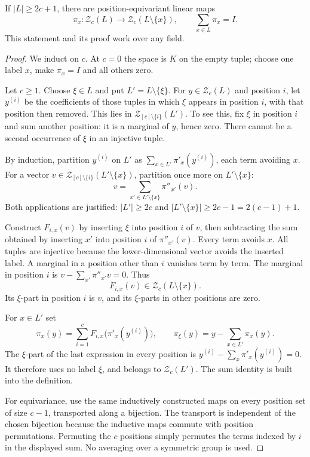 \begin{lemma}\label{tx:lem:unity}
If $|L|\ge2c+1$, there are position-equivariant linear maps
\[\pi_x:\mathcal Z_c(L)\longrightarrow \mathcal Z_c(L\setminus\{x\}),\qquad
\sum_{x\in L}\pi_x=I.
\]
This statement and its proof work over any field.
\end{lemma}
\begin{proof}
We induct on $c$. At $c=0$ the space is $K$ on the empty tuple; choose one label $x$, make $\pi_x=I$ and all others zero.

Let $c\ge1$. Choose $\xi\in L$ and put $L'=L\setminus\{\xi\}$. For $y\in \mathcal Z_c(L)$ and position $i$, let $y^{(i)}$ be the coefficients of those tuples in which $\xi$ appears in position $i$, with that position then removed. This lies in $\mathcal Z_{[c]\setminus\{i\}}(L')$. To see this, fix $\xi$ in position $i$ and sum another position: it is a marginal of $y$, hence zero. There cannot be a second occurrence of $\xi$ in an injective tuple.

By induction, partition $y^{(i)}$ on $L'$ as $\sum_{x\in L'}\pi'_x(y^{(i)})$, each term avoiding $x$. For a vector $v\in \mathcal Z_{[c]\setminus\{i\}}(L'\setminus\{x\})$, partition once more on $L'\setminus\{x\}$:
\[v=\sum_{x'\in L'\setminus\{x\}}\pi''_{x'}(v).
\]
Both applications are justified: $|L'|\ge2c$ and $|L'\setminus\{x\}|\ge2c-1=2(c-1)+1$.

Construct $F_{i,x}(v)$ by inserting $\xi$ into position $i$ of $v$, then subtracting the sum obtained by inserting $x'$ into position $i$ of $\pi''_{x'}(v)$. Every term avoids $x$. All tuples are injective because the lower-dimensional vector avoids the inserted label. A marginal in a position other than $i$ vanishes term by term. The marginal in position $i$ is $v-\sum_{x'}\pi''_{x'}v=0$. Thus
\[F_{i,x}(v)\in \mathcal Z_c(L\setminus\{x\}).
\]
Its $\xi$-part in position $i$ is $v$, and its $\xi$-parts in other positions are zero.

For $x\in L'$ set
\[\pi_x(y)=\sum_{i=1}^cF_{i,x}\bigl(\pi'_x(y^{(i)})\bigr),\qquad
\pi_\xi(y)=y-\sum_{x\in L'}\pi_x(y).
\]
The $\xi$-part of the last expression in every position is $y^{(i)}-\sum_x\pi'_x(y^{(i)})=0$. It therefore uses no label $\xi$, and belongs to $\mathcal Z_c(L')$. The sum identity is built into the definition.

For equivariance, use the same inductively constructed maps on every position set of size $c-1$, transported along a bijection. The transport is independent of the chosen bijection because the inductive maps commute with position permutations. Permuting the $c$ positions simply permutes the terms indexed by $i$ in the displayed sum. No averaging over a symmetric group is used.
\end{proof}

